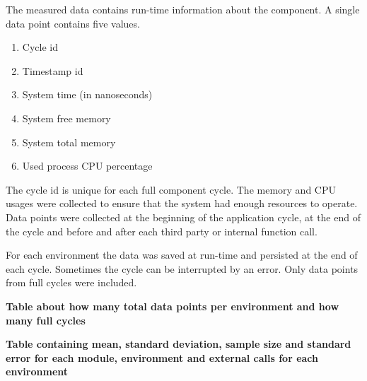 The measured data contains run-time information about the component.
A single data point contains five values.
\begin{enumerate}
    \item Cycle id
    \item Timestamp id
    \item System time (in nanoseconds)
    \item System free memory
    \item System total memory
    \item Used process CPU percentage
\end{enumerate}

The cycle id is unique for each full component cycle.
The memory and CPU usages were collected to ensure that the system had enough resources to operate.
Data points were collected at the beginning of the application cycle, at the end of the cycle and before and after each third party or internal function call.

For each environment the data was saved at run-time and persisted at the end of each cycle.
Sometimes the cycle can be interrupted by an error.
Only data points from full cycles were included.

\textbf{Table about how many total data points per environment and how many full cycles}

\textbf{Table containing mean, standard deviation, sample size and standard error for each module, environment and external calls for each environment}












